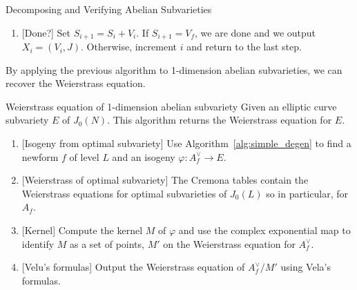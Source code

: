 \begin{algorithm}{Decomposing and Verifying Abelian Subvarieties}
\begin{enumerate}
\begin{enumerate}
                    Pick some $x\in V_f\setminus S_i$. Use Algorithm~\ref{} to
                    determine if there exists $V_i$ such that $x\in V_i$, where
                    $V_i$ is the image of an integral linear combination of
                    $\delta_j:A_f ^\vee \to J_0(N)$. If not, then $V_f$ does
                    not correspond to an abelian subvariety and we are done.
                \item{} [Done?]
                    Set $S_{i+1} = S_i + V_i$. If $S_{i+1}=V_f$, we are done
                    and we output $X_i=(V_i, J)$. Otherwise, increment $i$ and
                    return to the last step.
            \end{enumerate}
    \end{enumerate}
\end{algorithm}

By applying the previous algorithm to 1-dimension abelian subvarieties, we can
recover the Weierstrass equation.

\begin{algorithm}{Weierstrass equation of 1-dimension abelian subvariety}%
    \label{alg:weierstrass}
    Given an elliptic curve subvariety $E$ of $J_0(N)$. This algorithm
    returns the Weierstrass equation for $E$.
    \begin{enumerate}
        \item{}
            [Isogeny from optimal subvariety] Use
            Algorithm~\ref{alg:simple_degen} to find a newform $f$ of level
            $L$ and an isogeny $\varphi:A_f ^\vee\to E$.
        \item{}
            [Weierstrass of optimal subvariety] The Cremona tables contain the
            Weierstrass equations for optimal subvarieties of $J_0(L)$ so in
            particular, for $A_f$.
        \item{}
            [Kernel] Compute the kernel $M$ of $\varphi$ and use the complex
            exponential map to identify $M$ as a set of points, $M'$ on the
            Weierstrass equation for $A_f ^\vee$.
        \item{}
            [Velu's formulas] Output the Weierstrass equation of $A_f ^\vee/M'$ using
            Vela's formulas.
    \end{enumerate}
\end{algorithm}


